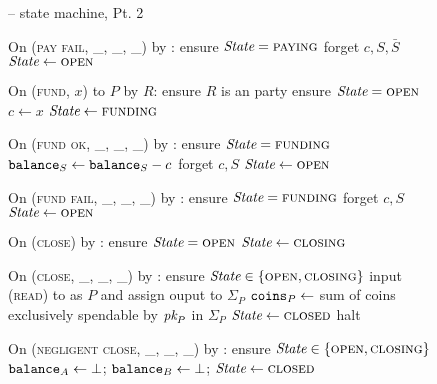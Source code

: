 \begin{figure}[H]
  \begin{systembox}{\fchan -- state machine, Pt. 2}
    \begin{algorithmic}[1]
      \State On (\textsc{pay fail}, \_, \_, \_) by \adversary:
      \Indent
        \State ensure $\itistate = \textsc{paying}$
        \State forget $c, S, \bar{S}$
        \State $\itistate \gets \textsc{open}$
      \EndIndent
      \Statex

      \State On (\textsc{fund}, $x$) to $P$ by $R$:
      \Indent
        \State ensure $R$ is an \fchan party
        \State ensure $\itistate = \textsc{open}$
        \State $c \gets x$
        \State $\itistate \gets \textsc{funding}$
      \EndIndent
      \Statex

      \State On (\textsc{fund ok}, \_, \_, \_) by \adversary:
      \Indent
        \State ensure $\itistate = \textsc{funding}$
        \State $\texttt{balance}_{S} \gets \texttt{balance}_{S} - c$
        \State forget $c, S$
        \State $\itistate \gets \textsc{open}$
      \EndIndent
      \Statex

      \State On (\textsc{fund fail}, \_, \_, \_) by \adversary:
      \Indent
        \State ensure $\itistate = \textsc{funding}$
        \State forget $c, S$
        \State $\itistate \gets \textsc{open}$
      \EndIndent
      \Statex

      \State On (\textsc{close}) by \environment:
      \Indent
        \State ensure $\itistate = \textsc{open}$
        \State $\itistate \gets \textsc{closing}$
      \EndIndent
      \Statex

      \State On (\textsc{close}, \_, \_, \_) by \adversary:
      \Indent
        \State ensure $\itistate \in \{\textsc{open}, \textsc{closing}\}$
            \State input (\textsc{read}) to \ledger as $P$ and assign ouput to
            $\Sigma_P$
            \State $\texttt{coins}_{P} \gets$ sum of coins exclusively spendable by
            $\textit{pk}_{P}$ in $\Sigma_P$
          \EndIf
        \EndFor
          \State $\itistate \gets \textsc{closed}$
        \Else \: 
          \State halt
        \EndIf
      \EndIndent
      \Statex

      \State On (\textsc{negligent close}, \_, \_, \_) by \adversary:
      \Indent
        \State ensure $\itistate \in \{\textsc{open}, \textsc{closing}\}$
        \State $\texttt{balance}_{A} \gets \bot$; $\texttt{balance}_{B} \gets \bot$;
        \State $\itistate \gets \textsc{closed}$
      \EndIndent
    \end{algorithmic}
  \end{systembox}
  \caption{}
  \label{code:functionality:state-machine-2}
\end{figure}
